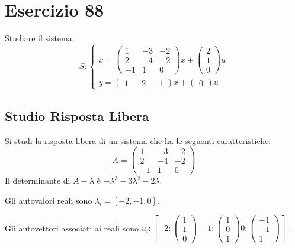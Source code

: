 \documentclass{article}
\begin{document}
\section{Esercizio 88 }
 Studiare il sistema \[S:\begin{cases}\overset{\cdot}{x} = \left(\begin{matrix}1 & -3 & -2\\2 & -4 & -2\\-1 & 1 & 0\end{matrix}\right) x+ \left(\begin{matrix}2\\1\\0\end{matrix}\right)u\\y = \left(\begin{matrix}1 & -2 & -1\end{matrix}\right) x +\left(\begin{matrix}0\end{matrix}\right) u\end{cases}\]\subsection{Studio Risposta Libera}
Si studi la risposta libera di un sistema che ha le seguenti caratteristiche: \[A = \left(\begin{matrix}1 & -3 & -2\\2 & -4 & -2\\-1 & 1 & 0\end{matrix}\right)\]
Il determinante di $A-\lambda$ è $ - \lambda^{3} - 3 \lambda^{2} - 2 \lambda $.

Gli autovalori reali sono $\lambda_i = [-2, -1, 0]$.

Gli autovettori associati ai reali sono $ u_i: [  -2: \left(\begin{matrix}1\\1\\0\end{matrix}\right)-1: \left(\begin{matrix}1\\0\\1\end{matrix}\right)0: \left(\begin{matrix}-1\\-1\\1\end{matrix}\right) ]$
.
\end{document}
